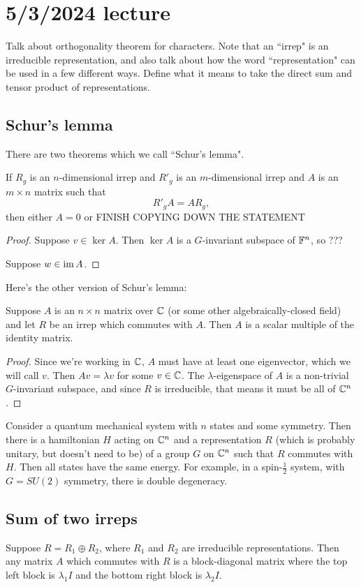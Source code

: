 \documentclass[class=article, crop=false]{standalone}
\begin{document}
\section{5/3/2024 lecture}
Talk about orthogonality theorem for characters. Note that an ``irrep" is an irreducible representation, and also talk about how the word ``representation" can be used in a few different ways. Define what it means to take the direct sum and tensor product of representations.
\subsection{Schur's lemma}
There are two theorems which we call ``Schur's lemma".
\begin{lem}
    If $R_g$ is an $n$-dimensional irrep and $R'_g$ is an $m$-dimensional irrep and $A$ is an $m \times n$ matrix such that
    \[ R'_g A = A R_g, \]
    then either $A=0$ or FINISH COPYING DOWN THE STATEMENT
\end{lem}
\begin{proof}
    Suppose $v \in \ker A$. Then $\ker A$ is a $G$-invariant subspace of $\mathbb{F}^n$, so ???
    \par
    Suppose $w \in \operatorname{im} A$.
\end{proof}
Here's the other version of Schur's lemma:
\begin{lem}
    Suppose $A$ is an $n \times n$ matrix over $\mathbb{C}$ (or some other algebraically-closed field) and let $R$ be an irrep which commutes with $A$. Then $A$ is a scalar multiple of the identity matrix.
\end{lem}
\begin{proof}
    Since we're working in $\mathbb{C}$, $A$ must have at least one eigenvector, which we will call $v$. Then $Av=\lambda v$ for some $v \in \mathbb{C}$. The $\lambda$-eigenspace of $A$ is a non-trivial $G$-invariant subspace, and since $R$ is irreducible, that means it must be all of $\mathbb{C}^n$.
\end{proof}
Consider a quantum mechanical system with $n$ states and some symmetry. Then there is a hamiltonian $H$ acting on $\mathbb{C}^n$ and a representation $R$ (which is probably unitary, but doesn't need to be) of a group $G$ on $\mathbb{C}^n$ such that $R$ commutes with $H$. Then all states have the same energy. For example, in a spin-$ \frac{1}{2}$ system, with $G=SU(2)$ symmetry, there is double degeneracy.

\subsection{Sum of two irreps}
Suppose $R = R_1 \oplus R_2$, where $R_1$ and $R_2$ are irreducible representations. Then any matrix $A$ which commutes with $R$ is a block-diagonal matrix where the top left block is $\lambda_1 I$ and the bottom right block is $\lambda_2 I$.
\end{document}
